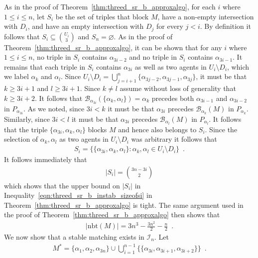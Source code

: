 As in the proof of Theorem~\ref{thm:threed_sr_b_approxalgo}, for each $i$ where $1\leq i \leq n$, let $S_i$ be the set of triples that block $M$, have a non-empty intersection with $D_i$, and have an empty intersection with $D_j$ for every $j < i$. By definition it follows that $S_i \subseteq \binom{U_i}{3}$ and $S_n = \varnothing$. As in the proof of Theorem~\ref{thm:threed_sr_b_approxalgo}, it can be shown that for any $i$ where $1\leq i \leq n$, no triple in $S_i$ contains $\alpha_{3i - 2}$ and no triple in $S_i$ contains $\alpha_{3i - 1}$. It remains that each triple in $S_i$ contains $\alpha_{3i}$ as well as two agents in $U_i \setminus D_i$, which we label $\alpha_k$ and $\alpha_l$. Since $U_i \setminus D_i = \bigcup_{j = i + 1}^{n} \{ \alpha_{3j - 2}, \alpha_{3j - 1}, \alpha_{3j} \}$, it must be that $k \geq 3i + 1$ and $l \geq 3i + 1$. Since $k \neq l$ assume without loss of generality that $k \geq 3i + 2$. It follows that $\mathscr{B}_{\alpha_{3i}}(\{ \alpha_k, \alpha_l \}) = \alpha_k$ precedes both $\alpha_{3i - 1}$ and $\alpha_{3i - 2}$ in $P_{\alpha_{3i}}$. As we noted, since $3i < k$ it must be that $\alpha_{3i}$ precedes $\mathscr{B}_{\alpha_k}(M)$ in $P_{\alpha_k}$. Similarly, since $3i < l$ it must be that $\alpha_{3i}$ precedes $\mathscr{B}_{\alpha_l}(M)$ in $P_{\alpha_l}$. It follows that the triple $\{ \alpha_{3i}, \alpha_k, \alpha_l \}$ blocks $M$ and hence also belongs to $S_i$. Since the selection of $\alpha_k, \alpha_l$ as two agents in $U_i \setminus D_i$ was arbitrary it follows that
\begin{align*}
    S_i = \{ \{ \alpha_{3i}, \alpha_k, \alpha_l \} : \alpha_k, \alpha_l \in U_i \setminus D_i \}\enspace.
\end{align*}
It follows immediately that
\begin{align*}
    |S_i| = \binom{3n - 3i}{2}
\end{align*}
which shows that the upper bound on $|S_i|$ in Inequality~\ref{eqn:threed_sr_b_instab_sizeofsi} in Theorem~\ref{thm:threed_sr_b_approxalgo} is tight. The same argument used in the proof of Theorem~\ref{thm:threed_sr_b_approxalgo} then shows that
\begin{align}
    |\textrm{nbt}(M)| = 3n^3 - \frac{3n^2}{2} - \frac{n}{2} \label{eqn:threed_sr_b_bsizeofnbttight}\enspace.
\end{align}
We now show that a stable matching exists in $\mathcal{I}_n$. Let
\begin{align*}
    M^* = \{ \alpha_1, \alpha_2, \alpha_{3n} \} \cup \bigcup\limits_{i = 1}^{n - 1} \{ \{ \alpha_{3i}, \alpha_{3i + 1}, \alpha_{3i + 2} \} \}\enspace.
\end{align*}
